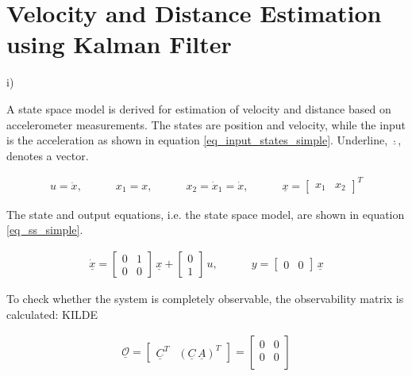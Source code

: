 \documentclass[fleqn,10pt]{olplainarticle}
\begin{document}
\section{Velocity and Distance Estimation using Kalman Filter}

i)


 A state space model is derived for estimation of velocity and distance based on accelerometer measurements. The states are position and velocity, while the input is the acceleration as shown in equation \ref{eq_input_states_simple}. Underline, $\underline{\cdot}$, denotes a vector.

\begin{align}
    u = \ddot{x}, \quad \quad \quad x_1 = x, \quad \quad \quad x_2 = \dot{x}_1 = \dot{x}, \quad \quad \quad \underline{x} = \begin{bmatrix}
    x_1 & x_2
    \end{bmatrix}
    ^T
    \label{eq_input_states_simple}
\end{align}

 The state and output equations, i.e. the state space model, are shown in equation \ref{eq_ss_simple}.


\begin{align}
    \underline{\dot{x}} = 
    \begin{bmatrix}
    0 & 1\\
    0 & 0
    \end{bmatrix}
    \, 
    \underline{x} +
    \begin{bmatrix}
    0\\
    1
    \end{bmatrix}
    \, u, \quad \quad \quad
    y =
    \begin{bmatrix}
    0 & 0
    \end{bmatrix}
    \,
    \underline{x}
    \label{eq_ss_simple}
\end{align}

 To check whether the system is completely observable, the observability matrix is calculated: KILDE

\begin{align}
    \underline{\mathcal{O}} =
    \begin{bmatrix}
    \underline{C}^T & (\underline{C}\,\underline{A})^T
    \end{bmatrix}
    =
    \begin{bmatrix}
    0 & 0 \\
    0 & 0 \\
    \end{bmatrix}
\end{align}
\end{document}
